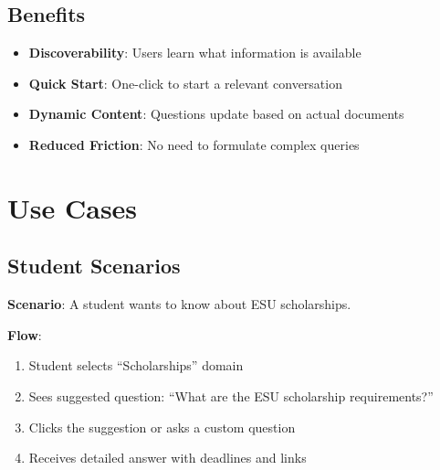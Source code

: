 \documentclass[12pt,a4paper]{article}
\begin{document}
\subsection{Benefits}

\begin{itemize}
    \item \textbf{Discoverability}: Users learn what information is available
    \item \textbf{Quick Start}: One-click to start a relevant conversation
    \item \textbf{Dynamic Content}: Questions update based on actual documents
    \item \textbf{Reduced Friction}: No need to formulate complex queries
\end{itemize}

\section{Use Cases}

\subsection{Student Scenarios}

\begin{tcolorbox}[colback=green!5, colframe=green!60!black, title=\textbf{Scholarship Application}]
    \textbf{Scenario}: A student wants to know about ESU scholarships.
    
    \textbf{Flow}:
    \begin{enumerate}[noitemsep]
        \item Student selects ``Scholarships'' domain
        \item Sees suggested question: ``What are the ESU scholarship requirements?''
        \item Clicks the suggestion or asks a custom question
        \item Receives detailed answer with deadlines and links
    \end{enumerate}
\end{tcolorbox}

\vspace{0.5cm}
\end{document}
